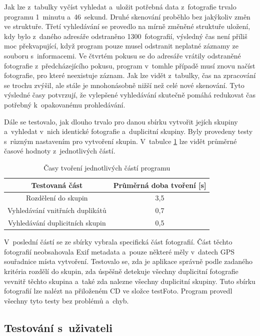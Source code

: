Jak lze z~tabulky vyčíst vyhledat a~uložit potřebná data z~fotografie trvalo programu 1~minutu a~46~sekund. Druhé skenování proběhlo bez jakýkoliv změn ve struktuře. Třetí vyhledávání se provedlo na mírně změněné struktuře uložení, kdy bylo z~daného adresáře odstraněno 1300~fotografií, výsledný čas není příliš moc překvapující, když program pouze musel odstranit neplatné záznamy ze souboru s~informacemi. Ve čtvrtém pokusu se do adresáře vrátily odstraněné fotografie z~předcházejícího pokusu, program v~tomhle případě musí znovu načíst fotografie, pro které neexistuje záznam. Jak lze vidět z~tabulky, čas na zpracování se trochu zvýšil, ale stále je mnohonásobně nižší než celé nové skenování. Tyto výsledné časy potvrzují, že vylepšené vyhledávání skutečně pomáhá redukovat čas potřebný k~opakovanému prohledávání.

Dále se testovalo, jak dlouho trvalo pro danou sbírku vytvořit jejích skupiny a~vyhledat v~nich identické fotografie a~duplicitní skupiny. Byly provedeny testy s~různým nastavením pro vytvoření skupin. V~tabulce \ref{cas_casti} lze vidět průměrné časové hodnoty z~jednotlivých částí. 

\begin{table}[h]
\centering
\begin{tabular}{|c|c|}
\hline
Testovaná část                  & Průměrná doba tvoření [s] \\ \hline
Rozdělení do skupin             & 3,5                       \\ \hline
Vyhledávání vnitřních duplikátů & 0,7                       \\ \hline
Vyhledávání duplicitních skupin & 0,5                       \\ \hline
\end{tabular}
\caption{Časy tvoření jednotlivých částí programu}
\label{cas_casti}
\end{table}

V~poslední částí se ze sbírky vybrala specifická část fotografií. Část těchto fotografií neobsahovala Exif metadata a~pouze některé měly v~datech GPS souřadnice místa vytvoření. Testovalo se, zda je aplikace správně podle zadaného kritéria rozdělí do skupin, zda úspěšně detekuje všechny duplicitní fotografie vevnitř těchto skupina a~také zda nalezne všechny duplicitní skupiny. Tuto sbírku fotografií lze nalézt na přiloženém CD ve složce testFoto. Program provedl všechny tyto testy bez problémů a~chyb.

\subsection*{Testování s~uživateli}

